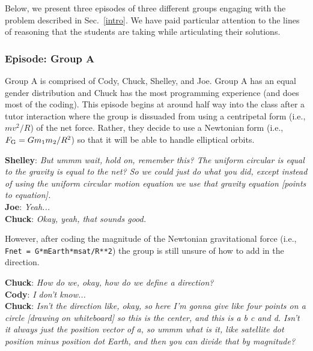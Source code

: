 \documentclass{msuphddissertation}
\begin{document}
\begin{doublespace}
Below, we present three episodes of three different groups engaging with the problem described in Sec.~\ref{intro}. We have paid particular attention to the lines of reasoning that the students are taking while articulating their solutions.

%
%

\subsubsection{Episode: Group A}

Group A is comprised of Cody, Chuck, Shelley, and Joe.  Group A has an equal gender distribution and Chuck has the most programming experience (and does most of the coding).  This episode begins at around half way into the class after a tutor interaction where the group is dissuaded from using a centripetal form (i.e., $mv^{2}/R$) of the net force.  Rather, they decide to use a Newtonian form (i.e., $F_{\rm G}=Gm_{1}m_{2}/R^{2}$) so that it will be able to handle elliptical orbits.


\vspace*{4pt}
\noindent\textbf{Shelley}: {\it But ummm wait, hold on, remember this?  The uniform circular is equal to the gravity is equal to the net?  So we could just do what you did, except instead of using the uniform circular motion equation we use that gravity equation [points to equation].}\\
\textbf{Joe}: {\it Yeah...}\\
\textbf{Chuck}: {\it Okay, yeah, that sounds good.}
\vspace*{4pt}

However, after coding the magnitude of the Newtonian gravitational force (i.e., \texttt{Fnet = G*mEarth*msat/R**2}) the group is still unsure of how to add in the direction.

\vspace*{4pt}
\noindent\textbf{Chuck}: {\it How do we, okay, how do we define a direction?}\\
\textbf{Cody}: {\it I don't know...}\\
\textbf{Chuck}: {\it Isn't the direction like, okay, so here I'm gonna give like four points on a circle [drawing on whiteboard] so this is the center, and this is a b c and d.  Isn't it always just the position vector of a, so ummm what is it, like satellite dot position minus position dot Earth, and then you can divide that by magnitude?}
\vspace*{4pt}


\end{doublespace}
\end{document}
